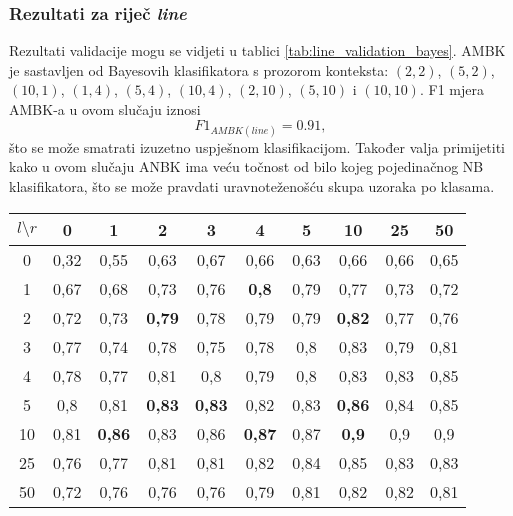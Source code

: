 \documentclass[10pt, a4paper]{article}
\begin{document}
\subsubsection{Rezultati za riječ \emph{line}} 
Rezultati validacije mogu se vidjeti u tablici \ref{tab:line_validation_bayes}.
AMBK je sastavljen od Bayesovih klasifikatora s prozorom konteksta: $(2,2)$,
$(5,2)$, $(10,1)$, $(1,4)$, $(5,4)$, $(10,4)$, $(2,10)$, $(5,10)$ i $(10,10)$.
F1 mjera AMBK-a u ovom slučaju iznosi
\begin{equation}
\label{eq:F1_ansambl_line}
F1_{AMBK(line)} = 0.91,
\end{equation}
što se može smatrati izuzetno uspješnom klasifikacijom. 
Također valja primijetiti kako u ovom slučaju ANBK ima veću točnost
od bilo kojeg pojedinačnog NB klasifikatora, što
se može pravdati uravnoteženošću skupa uzoraka po klasama.
\begin{table*}[!hbtp]
\caption{F1 mjere Bayesovih klasifikatora dobivene validacijom za riječ \emph{line}}
\label{tab:line_validation_bayes}
\begin{center}
\begin{tabular}{|c|ccccccccc|}
\hline
$l \setminus r$ & 0 & 1 & 2 & 3 & 4 & 5 & 10 & 25 & 50 \\
\hline
0  & 0,32  & 0,55  & 0,63  & 0,67  & 0,66  & 0,63  & 0,66  & 0,66  & 0,65 \\  
1  & 0,67  & 0,68  & 0,73  & 0,76  & \textbf{0,8}   & 0,79  & 0,77  & 0,73  & 0,72 \\ 
2  & 0,72  & 0,73  & \textbf{0,79}  & 0,78  & 0,79  & 0,79  & \textbf{0,82}  & 0,77  & 0,76 \\ 
3  &  0,77  & 0,74  & 0,78  & 0,75  & 0,78  & 0,8   & 0,83  & 0,79  & 0,81 \\ 
4  & 0,78  & 0,77  & 0,81  & 0,8   & 0,79  & 0,8   & 0,83  & 0,83  & 0,85 \\ 
5  & 0,8   & 0,81  & \textbf{0,83}  & \textbf{0,83}  & 0,82  & 0,83  & \textbf{0,86}  & 0,84  & 0,85 \\ 
10 & 0,81  & \textbf{0,86}  & 0,83  & 0,86  & \textbf{0,87}  & 0,87  & \textbf{0,9}   & 0,9   & 0,9  \\
25 & 0,76  & 0,77  & 0,81  & 0,81  & 0,82  & 0,84  & 0,85  & 0,83  & 0,83 \\ 
50 & 0,72  & 0,76  & 0,76  & 0,76  & 0,79  & 0,81  & 0,82  & 0,82  & 0,81 \\ 
\hline
\end{tabular}
\end{center}
\end{table*}
\end{document}

